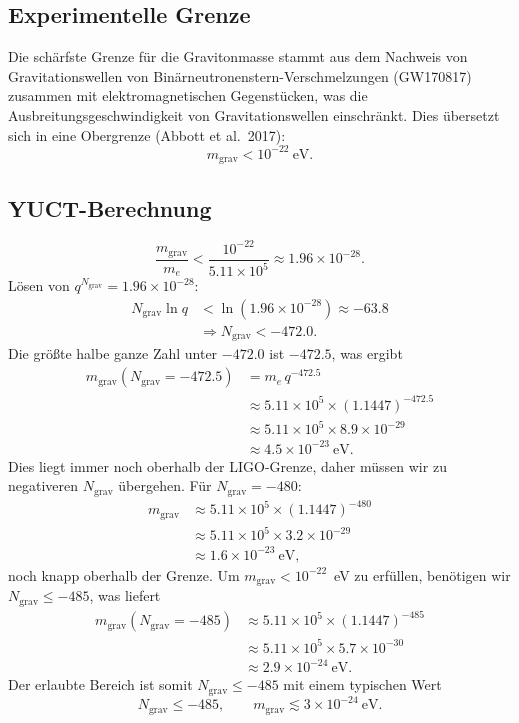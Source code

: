 \documentclass[12pt,a4paper]{article}
\begin{document}
	\subsection{Experimentelle Grenze}
	
	Die schärfste Grenze für die Gravitonmasse stammt aus dem Nachweis von Gravitationswellen von
	Binärneutronenstern-Verschmelzungen (GW170817) zusammen mit elektromagnetischen Gegenstücken, was die
	Ausbreitungsgeschwindigkeit von Gravitationswellen einschränkt. Dies übersetzt sich in eine Obergrenze
	(Abbott et al.\ 2017):
	\[
	m_{\mathrm{grav}} < 10^{-22}~\mathrm{eV}.
	\]
	
	\subsection{YUCT-Berechnung}
	
	\[
	\frac{m_{\mathrm{grav}}}{m_e} < \frac{10^{-22}}{5.11\times10^5} \approx 1.96\times 10^{-28}.
	\]
	Lösen von $q^{N_{\mathrm{grav}}} = 1.96\times10^{-28}$:
	\[
	\begin{aligned}
		N_{\mathrm{grav}} \ln q &< \ln(1.96\times10^{-28}) \approx -63.8 \\
		&\Longrightarrow N_{\mathrm{grav}} < -472.0 .
	\end{aligned}
	\]
	Die größte halbe ganze Zahl unter $-472.0$ ist $-472.5$, was ergibt
	\[
	\begin{aligned}
		m_{\mathrm{grav}}(N_{\mathrm{grav}} = -472.5) &= m_e \, q^{-472.5} \\
		&\approx 5.11\times10^5 \times (1.1447)^{-472.5} \\
		&\approx 5.11\times10^5 \times 8.9\times10^{-29} \\
		&\approx 4.5 \times 10^{-23}~\mathrm{eV}.
	\end{aligned}
	\]
	Dies liegt immer noch oberhalb der LIGO-Grenze, daher müssen wir zu negativeren $N_{\mathrm{grav}}$ übergehen.
	Für $N_{\mathrm{grav}} = -480$:
	\[
	\begin{aligned}
		m_{\mathrm{grav}} &\approx 5.11\times10^5 \times (1.1447)^{-480} \\
		&\approx 5.11\times10^5 \times 3.2\times10^{-29} \\
		&\approx 1.6 \times 10^{-23}~\mathrm{eV},
	\end{aligned}
	\]
	noch knapp oberhalb der Grenze. Um $m_{\mathrm{grav}} < 10^{-22}$~eV zu erfüllen, benötigen wir
	$N_{\mathrm{grav}} \le -485$, was liefert
	\[
	\begin{aligned}
		m_{\mathrm{grav}}(N_{\mathrm{grav}} = -485) &\approx 5.11\times10^5 \times (1.1447)^{-485} \\
		&\approx 5.11\times10^5 \times 5.7\times10^{-30} \\
		&\approx 2.9 \times 10^{-24}~\mathrm{eV}.
	\end{aligned}
	\]
	Der erlaubte Bereich ist somit $N_{\mathrm{grav}} \le -485$ mit einem typischen Wert
	\[
	\boxed{N_{\mathrm{grav}} \le -485}, \qquad
	\boxed{m_{\mathrm{grav}} \lesssim 3 \times 10^{-24}~\mathrm{eV}} .
	\]
	
\end{document}
